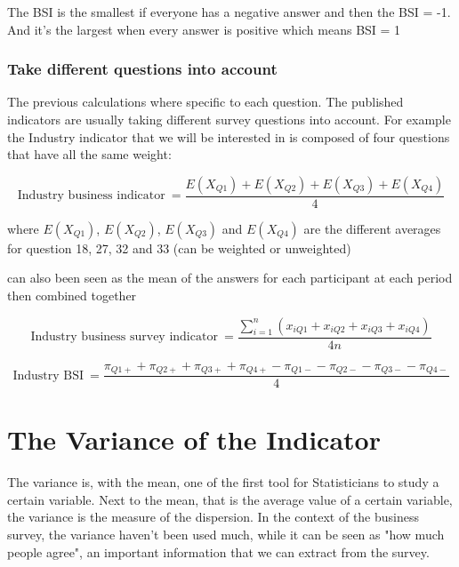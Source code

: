 \documentclass[12pt,a4paper,oneside]{book}
\begin{document}
The BSI is the smallest if everyone has a negative answer and then the BSI = -1. 
And it's the largest when every answer is positive which means BSI = 1


\subsection{Take different questions into account}

The previous calculations where specific to each question. The published indicators are usually taking different survey questions into account. For example the Industry indicator that we will be interested in is composed of four questions that have all the same weight:

\begin{equation}
    \mbox{Industry business indicator}\ = \frac{E(X_{Q1}) + E(X_{Q2}) + E(X_{Q3}) + E(X_{Q4})}{4}
\end{equation}

where 
$E(X_{Q1})$, $E(X_{Q2})$, $E(X_{Q3})$ and $E(X_{Q4})$ are the different averages for question 18, 27, 32 and 33 (can be weighted or unweighted)

can also been seen as the mean of the answers for each participant at each period then combined together

\begin{equation}
    \mbox{Industry business survey indicator}\ = \frac{\sum_{i=1}^n \left(x_{i Q1} + x_{i Q2} + x_{i Q3} + x_{i Q4} \right)}{4n}
\end{equation}

\begin{equation}
    \mbox{Industry BSI}\ = \frac{\pi_{Q1+} + \pi_{Q2+} + \pi_{Q3+} + \pi_{Q4+} - \pi_{Q1-} - \pi_{Q2-} - \pi_{Q3-} - \pi_{Q4-} }{4}
\end{equation}


\chapter{The Variance of the Indicator}

The variance is, with the mean, one of the first tool for Statisticians to study a certain variable. Next to the mean, that is the average value of a certain variable, the variance is the measure of the dispersion. 
In the context of the business survey, the variance haven't been used much, while it can be seen as "how much people agree", an important information that we can extract from the survey.
\end{document}
